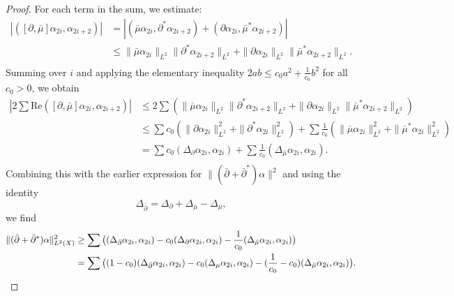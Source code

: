 \documentclass[12pt, twoside]{article}
\theoremstyle{definition}
\numberwithin{equation}{section}
\def \a {\alpha }
\def \De {\Delta}
\def\pa{\partial}
\begin{document}
\begin{proof}
	For each term in the sum, we estimate:
	\begin{equation*}
	\begin{split}
	|([\pa,\bar{\mu}]\a_{2i},\a_{2i+2})|&=|(\bar{\mu}\a_{2i},\pa^{\ast}\a_{2i+2})+(\pa\a_{2i},\bar{\mu}^{\ast}\a_{2i+2})|\\
	&\leq \|\bar{\mu}\a_{2i}\|_{L^{2}}\|\pa^{\ast}\a_{2i+2}\|_{L^{2}}+ \|\pa\a_{2i}\|_{L^{2}}\|\bar{\mu}^{\ast}\a_{2i+2}\|_{L^{2}}.\\
	\end{split}
	\end{equation*}
	Summing over $i$ and applying the elementary inequality $2ab\leq c_{0}a^{2}+\frac{1}{c_{0}}b^{2}$
	for all $c_{0}>0$, we obtain
	\begin{equation*}
	\begin{split}
	|2\sum\mathrm{Re}([\pa,\bar{\mu}]\a_{2i},\a_{2i+2})|
	&\leq2\sum(\|\bar{\mu}\a_{2i}\|_{L^{2}}\|\pa^{\ast}\a_{2i+2}\|_{L^{2}}+ \|\pa\a_{2i}\|_{L^{2}}\|\bar{\mu}^{\ast}\a_{2i+2}\|_{L^{2}})\\
	&\leq \sum c_{0}(\|\pa\a_{2i}\|^2_{L^{2}}+\|\pa^{\ast}\a_{2i}\|^2_{L^{2}})
	+\sum\frac{1}{c_{0}}(\|\bar{\mu}\a_{2i}\|^2_{L^{2}}+\|\bar{\mu}^{\ast}\a_{2i}\|^2_{L^{2}})\\
	&=\sum c_{0}(\De_{\pa}\a_{2i},\a_{2i})+\sum\frac{1}{c_{0}}(\De_{\bar{\mu}}\a_{2i},\a_{2i}).\\
	\end{split}
	\end{equation*}	
	Combining this with the earlier expression for $\|({\bar{\partial}+\bar{\partial}^{\ast}})\a\|^{2}$ and using the identity $$\De_{\bar{\pa}}=\De_{\pa}+\De_{\bar{\mu}}-\De_{\mu},$$
	we find 
	\begin{equation*}
	\begin{split}
	\|({\bar{\partial}+\bar{\partial}^{\ast}})\a\|_{L^{2}(X)}^{2}&\geq\sum\big{(}(\De_{\bar{\pa}}\a_{2i},\a_{2i})- c_{0}(\De_{\pa}\a_{2i},\a_{2i})-\frac{1}{c_{0}}(\De_{\bar{\mu}}\a_{2i},\a_{2i})\big{)}\\
	&=\sum\big{(}(1-c_{0})(\De_{\bar{\pa}}\a_{2i},\a_{2i})- c_{0}(\De_{\mu}\a_{2i},\a_{2i})-(\frac{1}{c_{0}}-c_{0})(\De_{\bar{\mu}}\a_{2i},\a_{2i})\big{)}.\\
	\end{split}
	\end{equation*}
	

\end{proof}
\end{document}
